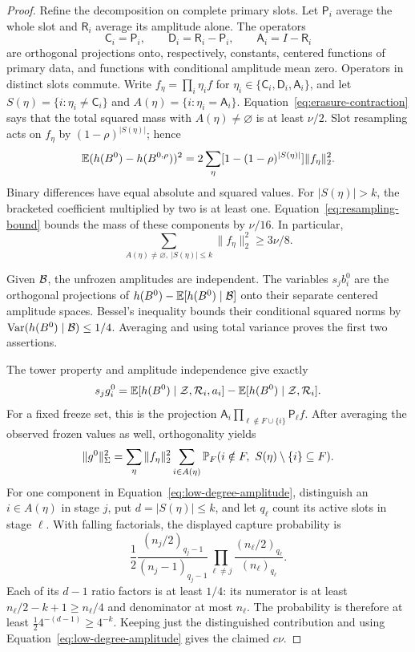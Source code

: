 \begin{proof}
Refine the decomposition on complete primary slots. Let $\mathsf P_i$
average the whole slot and $\mathsf R_i$ average its amplitude alone.
The operators
\[
 \mathsf C_i=\mathsf P_i,\qquad
 \mathsf D_i=\mathsf R_i-\mathsf P_i,\qquad
 \mathsf A_i=I-\mathsf R_i
\]
are orthogonal projections onto, respectively, constants, centered
functions of primary data, and functions with conditional amplitude mean
zero. Operators in distinct slots commute. Write $f_\eta=\prod_i\eta_if$
for $\eta_i\in\{\mathsf C_i,\mathsf D_i,\mathsf A_i\}$, and let
$S(\eta)=\{i:\eta_i\ne\mathsf C_i\}$ and
$A(\eta)=\{i:\eta_i=\mathsf A_i\}$. Equation~\ref{eq:erasure-contraction}
says that the total squared mass with $A(\eta)\ne\varnothing$ is at
least $\nu/2$. Slot resampling acts on $f_\eta$ by
$(1-\rho)^{|S(\eta)|}$; hence
\[
 \mathbb E(h(B^0)-h(B^{0,\rho}))^2
 =2\sum_\eta[1-(1-\rho)^{|S(\eta)|}]\|f_\eta\|_2^2.
\]
Binary differences have equal absolute and squared values. For
$|S(\eta)|>k$, the bracketed coefficient multiplied by two is at least
one. Equation~\ref{eq:resampling-bound} bounds the mass of these
components by $\nu/16$. In particular,
\begin{equation}\label{eq:low-degree-amplitude}
 \sum_{A(\eta)\ne\varnothing,\ |S(\eta)|\le k}
       \|f_\eta\|_2^2\ge3\nu/8.
\end{equation}

Given $\mathcal B$, the unfrozen amplitudes are independent. The variables
$s_jb_i^0$ are the orthogonal projections of
$h(B^0)-\mathbb E[h(B^0)\mid\mathcal B]$ onto their separate centered amplitude
spaces. Bessel's inequality bounds their conditional squared norms by
$\operatorname{Var}(h(B^0)\mid\mathcal B)\le1/4$. Averaging and using total variance proves
the first two assertions.

The tower property and amplitude independence give exactly
\[
 s_jg_i^0=\mathbb E[h(B^0)\mid\mathcal Z,\mathcal R_i,a_i]
             -\mathbb E[h(B^0)\mid\mathcal Z,\mathcal R_i].
\]
For a fixed freeze set, this is the projection
$\mathsf A_i\prod_{\ell\notin F\cup\{i\}}\mathsf P_\ell f$.
After averaging the observed frozen values as well, orthogonality yields
\[
 \|g^0\|_\Sigma^2
 =\sum_\eta\|f_\eta\|_2^2
   \sum_{i\in A(\eta)}
   \mathbb P_F(i\notin F,\ S(\eta)\setminus\{i\}\subseteq F).
\]
For one component in Equation~\ref{eq:low-degree-amplitude}, distinguish
an $i\in A(\eta)$ in stage $j$, put $d=|S(\eta)|\le k$, and let
$q_\ell$ count its active slots in stage $\ell$. With falling factorials,
the displayed capture probability is
\[
 \frac12\frac{(n_j/2)_{q_j-1}}{(n_j-1)_{q_j-1}}
       \prod_{\ell\ne j}\frac{(n_\ell/2)_{q_\ell}}{(n_\ell)_{q_\ell}}.
\]
Each of its $d-1$ ratio factors is at least $1/4$: its numerator is
at least $n_\ell/2-k+1\ge n_\ell/4$ and denominator at most $n_\ell$.
The probability is therefore at least $\tfrac12 4^{-(d-1)}\ge4^{-k}$.
Keeping just the distinguished contribution and using
Equation~\ref{eq:low-degree-amplitude} gives the claimed $c\nu$.
\end{proof}

